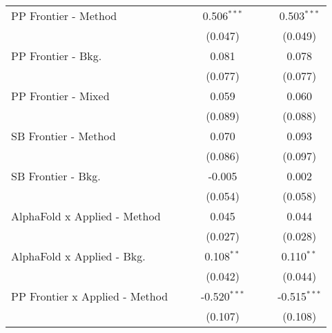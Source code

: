 \begin{tabular}{lcccccc}
   PP Frontier - Method           &                &              & 0.506$^{***}$  &                &              & 0.503$^{***}$\\   
                                  &                &              & (0.047)        &                &              & (0.049)\\   
   PP Frontier - Bkg.             &                &              & 0.081          &                &              & 0.078\\   
                                  &                &              & (0.077)        &                &              & (0.077)\\   
   PP Frontier - Mixed            &                &              & 0.059          &                &              & 0.060\\   
                                  &                &              & (0.089)        &                &              & (0.088)\\   
   SB Frontier - Method           &                &              & 0.070          &                &              & 0.093\\   
                                  &                &              & (0.086)        &                &              & (0.097)\\   
   SB Frontier - Bkg.             &                &              & -0.005         &                &              & 0.002\\   
                                  &                &              & (0.054)        &                &              & (0.058)\\   
   AlphaFold x Applied - Method   &                &              & 0.045          &                &              & 0.044\\   
                                  &                &              & (0.027)        &                &              & (0.028)\\   
   AlphaFold x Applied - Bkg.     &                &              & 0.108$^{**}$   &                &              & 0.110$^{**}$\\   
                                  &                &              & (0.042)        &                &              & (0.044)\\   
   PP Frontier x Applied - Method &                &              & -0.520$^{***}$ &                &              & -0.515$^{***}$\\   
                                  &                &              & (0.107)        &                &              & (0.108)\\   

\end{tabular}
